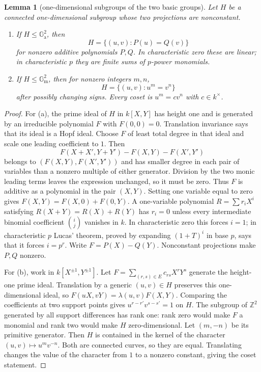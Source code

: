 \documentclass[11pt,oneside]{article}
\newtheorem{lemma}[theorem]{Lemma}
\theoremstyle{definition}
\theoremstyle{remark}
\newcommand{\Ga}{\mathbb G_{\mathrm a}}
\newcommand{\Gm}{\mathbb G_{\mathrm m}}
\begin{document}
\begin{lemma}[one-dimensional subgroups of the two basic groups]\label{lem:subgroup-classification}
Let $H$ be a connected one-dimensional subgroup whose two projections are nonconstant.
\begin{enumerate}[label=(\alph*),leftmargin=10mm]
\item If $H\leq\Ga^2$, then
\[
 H=\{(u,v):P(u)=Q(v)\}
\]
for nonzero additive polynomials $P,Q$.  In characteristic zero these are linear; in
characteristic $p$ they are finite sums of $p$-power monomials.
\item If $H\leq\Gm^2$, then for nonzero integers $m,n$,
\[
 H=\{(u,v):u^m=v^n\}
\]
after possibly changing signs.  Every coset is $u^m=cv^n$ with $c\in k^\times$.
\end{enumerate}
\end{lemma}
\begin{proof}
For (a), the prime ideal of $H$ in $k[X,Y]$ has height one and is generated by an
irreducible polynomial $F$ with $F(0,0)=0$.  Translation invariance says that its ideal
is a Hopf ideal.  Choose $F$ of least total degree in that ideal and scale one leading
coefficient to $1$.  Then
\[
 F(X+X',Y+Y')-F(X,Y)-F(X',Y')
\]
belongs to $(F(X,Y),F(X',Y'))$ and has smaller degree in each pair of variables than a
nonzero multiple of either generator.  Division by the two monic leading terms leaves
the expression unchanged, so it must be zero.  Thus $F$ is additive as a polynomial in
the pair $(X,Y)$.  Setting one variable equal to zero gives
$F(X,Y)=F(X,0)+F(0,Y)$.  A one-variable polynomial
$R=\sum r_iX^i$ satisfying $R(X+Y)=R(X)+R(Y)$ has $r_i=0$ unless every intermediate
binomial coefficient $\binom ij$ vanishes in $k$.  In characteristic zero this forces
$i=1$; in characteristic $p$ Lucas' theorem, proved by expanding
$(1+T)^i$ in base $p$, says that it forces $i=p^r$.  Write
$F=P(X)-Q(Y)$.  Nonconstant projections make $P,Q$ nonzero.

For (b), work in $k[X^{\pm1},Y^{\pm1}]$.  Let
$F=\sum_{(r,s)\in E}c_{rs}X^rY^s$ generate the height-one prime ideal.  Translation by
a generic $(u,v)\in H$ preserves this one-dimensional ideal, so
$F(uX,vY)=\lambda(u,v)F(X,Y)$.  Comparing the coefficients at two support points gives
$u^{r-r'}v^{s-s'}=1$ on $H$.  The subgroup of $\mathbb Z^2$ generated by all support
differences has rank one: rank zero would make $F$ a monomial and rank two would make
$H$ zero-dimensional.  Let $(m,-n)$ be its primitive generator.  Then $H$ is contained
in the kernel of the character $(u,v)\mapsto u^mv^{-n}$.  Both are connected curves, so
they are equal.  Translating changes the value of the character from $1$ to a nonzero
constant, giving the coset statement.
\end{proof}
\end{document}
